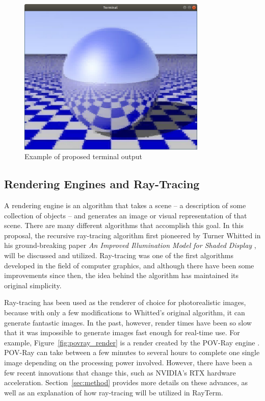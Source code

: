 \documentclass[11pt]{article}
\newcommand{\name}{{\sc RayTerm}}
\begin{document}
\begin{figure}[htb]
  \centering
  \includegraphics[width=0.8\textwidth]{resources/checker_metal}
  \caption{Example of proposed terminal output}
  \label{fig:checker_metal}
\end{figure}

\subsection{Rendering Engines and Ray-Tracing}
\label{sec:introduction:raytracing}

A rendering engine is an algorithm that takes a scene -- a description of some collection of objects -- and generates an image or visual representation of that scene.
There are many different algorithms that accomplish this goal.
In this proposal, the recursive ray-tracing algorithm first pioneered by Turner Whitted in his ground-breaking paper {\it An Improved Illumination Model for Shaded Display} \cite{whitted1980improved}, will be discussed and utilized.
Ray-tracing was one of the first algorithms developed in the field of computer graphics, and although there have been some improvements since then, the idea behind the algorithm has maintained its original simplicity.

Ray-tracing has been used as the renderer of choice for photorealistic images, because with only a few modifications to Whitted's original algorithm, it can generate fantastic images.
In the past, however, render times have been so slow that it was impossible to generate images fast enough for real-time use.
For example, Figure~\ref{fig:povray_render} is a render created by the POV-Ray engine \cite{povray}.
POV-Ray can take between a few minutes to several hours to complete one single image depending on the processing power involved.
However, there have been a few recent innovations that change this, such as NVIDIA's RTX hardware acceleration.
Section~\ref{sec:method} provides more details on these advances, as well as an explanation of how ray-tracing will be utilized in \name.
\end{document}
